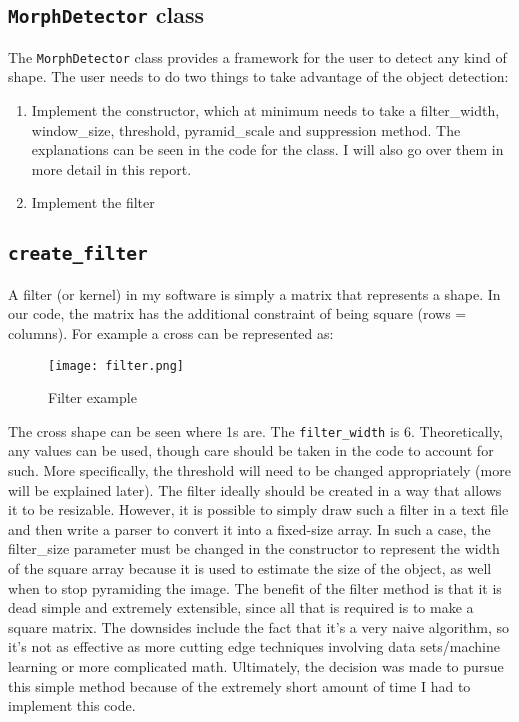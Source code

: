 \documentclass[11pt]{article}
\begin{document}
\subsection{\texttt{MorphDetector} class}
The \texttt{MorphDetector} class provides a framework for the user to detect any kind of shape.  The user needs to do two things to take advantage of the object detection:
\begin{enumerate}
\item Implement the constructor, which at minimum needs to take a filter\_width, window\_size, threshold, pyramid\_scale and suppression method.  The explanations can be seen in the code for the class.  I will also go over them in more detail in this report.
\item Implement the filter
\end{enumerate}
\subsection{\texttt{create\_filter}}
A filter (or kernel) in my software is simply a matrix that represents a shape.  In our code, the matrix has the additional constraint of being square (rows = columns).  For example a cross can be represented as:

\begin{figure}[h]
\caption{Filter example}
\texttt{[image: filter.png]}
\label{fig:filter}
\end{figure}


The cross shape can be seen where 1s are.  The \texttt{filter\_width} is 6.  Theoretically, any values can be used, though care should be taken in the code to account for such.  More specifically, the threshold will need to be changed appropriately (more will be explained later).  The filter ideally should be created in a way that allows it to be resizable.  However, it is possible to simply draw such a filter in a text file and then write a parser to convert it into a fixed-size array.  In such a case, the filter\_size parameter must be changed in the constructor to represent the width of the square array because it is used to estimate the size of the object, as well when to stop pyramiding the image.  The benefit of the filter method is that it is dead simple and extremely extensible, since all that is required is to make a square matrix.  The downsides include the fact that it's a very naive algorithm, so it's not as effective as more cutting edge techniques involving data sets/machine learning or more complicated math.  Ultimately, the decision was made to pursue this simple method because of the extremely short amount of time I had to implement this code.
\end{document}
